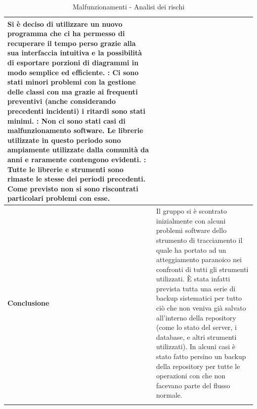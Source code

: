\documentclass[12pt,a4paper]{article}
\begin{document}
\begin{center}
\begin{longtable}[H]{p{} p{}}
            Si è deciso di utilizzare un nuovo programma che ci ha permesso di recuperare il tempo
            perso grazie alla sua interfaccia intuitiva e la possibilità di esportare porzioni di diagrammi
            in modo semplice ed efficiente. \newline
		\textbf{\FPD{}}: Ci sono stati minori problemi con la gestione delle classi con \mgls{tracy} ma grazie
			ai frequenti \mgls{backup} preventivi (anche considerando precedenti incidenti) i ritardi sono stati
			minimi. \newline
		\textbf{\FC{}}: Non ci sono stati casi di malfunzionamento software. Le librerie utilizzate in questo periodo sono ampiamente utilizzate dalla comunità da anni e raramente contengono \mgls{bug} evidenti. \newline
		\textbf{\FVV{}}: Tutte le librerie e strumenti sono rimaste le stesse dei periodi precedenti. Come previsto non si sono riscontrati particolari problemi con esse. \\* 
  		\midrule
	    \textbf{Conclusione} & Il gruppo si è scontrato inizialmente con alcuni problemi software dello strumento di tracciamento \mgls{tracy} il quale ha portato ad un atteggiamento paranoico nei confronti di tutti gli strumenti utilizzati. È stata infatti prevista tutta una serie di backup sistematici per tutto ciò che non veniva già salvato all'interno della repository (come lo stato del server, i database, e altri strumenti utilizzati). In alcuni casi è stato fatto persino un backup della repository per tutte le operazioni con \mgls{git} che non facevano parte del flusso normale. \\*
		\bottomrule
		\caption{Malfunzionamenti \mgls{software} - Analisi dei rischi}
	\end{longtable}
\end{center}
\end{document}
